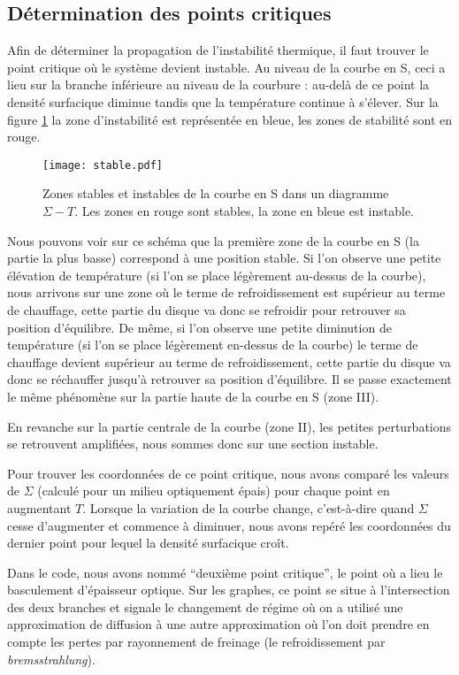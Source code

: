 \subsection{Détermination des points critiques}
Afin de déterminer la propagation de l'instabilité thermique, il faut trouver le point critique où le système devient instable. Au niveau de la courbe en S, ceci a lieu sur la branche inférieure au niveau de la courbure : au-delà de ce point la densité surfacique diminue tandis que la température continue à s'élever. Sur la figure \ref{Fig::stable} la zone d'instabilité est représentée en bleue, les zones de stabilité sont en rouge.

\begin{figure}[htb!]
	\centering
	\texttt{[image: stable.pdf]}
	\caption{Zones stables et instables de la courbe en S dans un diagramme $\Sigma-T$. Les zones en rouge sont stables, la zone en bleue est instable. }
	\label{Fig::stable}
\end{figure}

Nous pouvons voir sur ce schéma que la première zone de la courbe en S (la partie la plus basse) correspond à une position stable. Si l'on observe une petite élévation de température (si l'on se place légèrement au-dessus de la courbe), nous arrivons sur une zone où le terme de refroidissement est supérieur au terme de chauffage, cette partie du disque va donc se refroidir pour retrouver sa position d'équilibre. De même, si l'on observe une petite diminution de température (si l'on se place légèrement en-dessus de la courbe) le terme de chauffage devient supérieur au terme de refroidissement, cette partie du disque va donc se réchauffer jusqu'à retrouver sa position d'équilibre. Il se passe exactement le même phénomène sur la partie haute de la courbe en S (zone III).

En revanche sur la partie centrale de la courbe (zone II), les petites perturbations se retrouvent amplifiées, nous sommes donc sur une section instable.


Pour trouver les coordonnées de ce point critique, nous avons comparé les valeurs de $\Sigma$ (calculé pour un milieu optiquement épais) pour chaque point en augmentant $T$. Lorsque la variation de la courbe change, c'est-à-dire quand $\Sigma$ cesse d'augmenter et commence à diminuer, nous avons repéré les coordonnées du dernier point pour lequel la densité surfacique croît.  

Dans le code, nous avons nommé ``deuxième point critique'', le point où a lieu le basculement d'épaisseur optique. Sur les graphes, ce point se situe à l'intersection des deux branches et signale le changement de régime où on a utilisé une approximation de diffusion à une autre approximation où l'on doit prendre en compte les pertes par rayonnement de freinage (le refroidissement par \emph{bremsstrahlung}).

